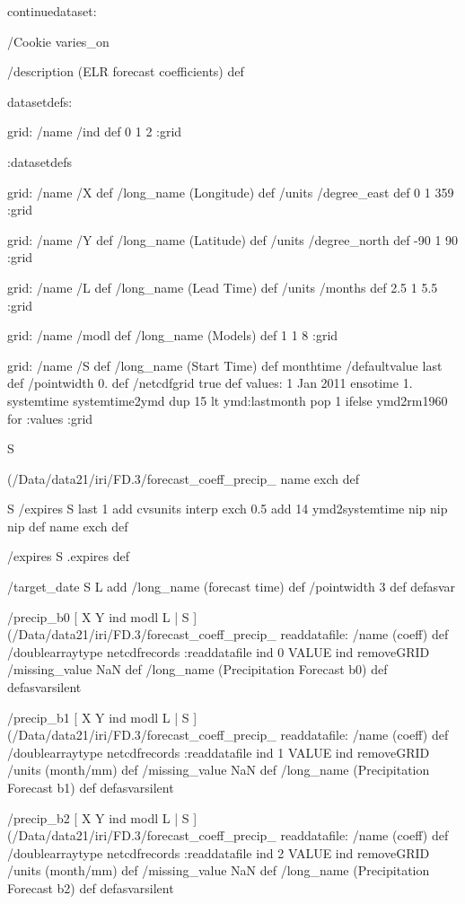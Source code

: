 \begin{ingrid}

	continuedataset:


/Cookie varies_on

/description (ELR forecast coefficients) def

datasetdefs:

        grid:
        /name /ind def
        0 1 2
        :grid

:datasetdefs

grid:
/name /X def
/long_name (Longitude) def
/units /degree_east def
0 1 359
:grid

grid:
/name /Y def
/long_name (Latitude) def
/units /degree_north def
-90 1 90
:grid

grid:
/name /L def
/long_name (Lead Time) def
/units /months def
2.5 1 5.5
:grid

grid:
/name /modl def
/long_name (Models) def
1 1 8
:grid

grid:
/name /S def
/long_name (Start Time) def
monthtime
/defaultvalue { last } def
/pointwidth 0. def
/netcdfgrid true def
values:
1 Jan 2011 ensotime
1.
systemtime
        systemtime2ymd dup 15 lt {
                ymd:lastmonth
        }{
                pop 1
        }ifelse
        ymd2rm1960
        {} for
:values
:grid

S { (/Data/data21/iri/FD.3/forecast_coeff_precip_%
   name exch def

S
/expires
  S last
    1 add
    cvsunits
    interp exch
       0.5 add
       14 ymd2systemtime
      nip nip nip
        def
name exch def

/expires S .expires def

/target_date {S L
        add /long_name (forecast time) def /pointwidth 3 def} defasvar

/precip_b0 {
[ X Y ind modl L | S ]
(/Data/data21/iri/FD.3/forecast_coeff_precip_%
readdatafile:
/name (coeff) def
/doublearraytype netcdfrecords
:readdatafile
ind 0 VALUE
ind removeGRID
/missing_value NaN def
/long_name (Precipitation Forecast b0) def
}defasvarsilent

/precip_b1 {
[ X Y ind modl L | S ]
(/Data/data21/iri/FD.3/forecast_coeff_precip_%
readdatafile:
/name (coeff) def
/doublearraytype netcdfrecords
:readdatafile
ind 1 VALUE
ind removeGRID
/units (month/mm) def
/missing_value NaN def
/long_name (Precipitation Forecast b1) def
}defasvarsilent

/precip_b2 {
[ X Y ind modl L | S ]
(/Data/data21/iri/FD.3/forecast_coeff_precip_%
readdatafile:
/name (coeff) def
/doublearraytype netcdfrecords
:readdatafile
ind 2 VALUE
ind removeGRID
/units (month/mm) def
/missing_value NaN def
/long_name (Precipitation Forecast b2) def
}defasvarsilent

}
\end{ingrid}
